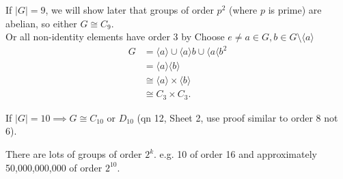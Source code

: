 If $|G| = 9$, we will show later that groups of order $p^2$ (where $p$ is prime) are abelian, so either $G \cong C_9$. \\
Or all non-identity elements have order 3 by 
Choose $e \neq a \in G, b \in G \setminus \langle a \rangle$
\begin{align*}
  G &= \langle a \rangle \cup \langle a \rangle b \cup \langle a \langle b^2 \\
  &= \langle a \rangle \langle b \rangle \\
  &\cong \langle a \rangle \times \langle b \rangle \\
  &\cong C_3 \times C_3.
\end{align*} 

If $|G| = 10 \implies G \cong C_{10} \text{ or } D_{10}$ (qn 12, Sheet 2, use proof similar to order 8 not 6).

\begin{remark}
  There are lots of groups of order $2^k$.
  e.g. 10 of order 16 and approximately 50,000,000,000 of order $2^{10}$.
\end{remark} 